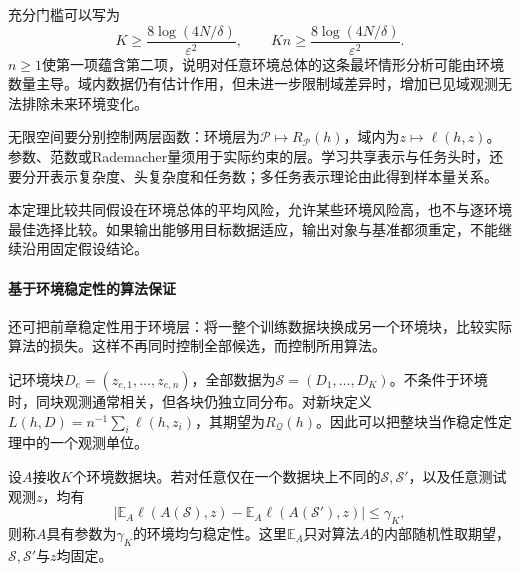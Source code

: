 充分门槛可以写为
\[
 K\geq\frac{8\log(4N/\delta)}{\varepsilon^2},\qquad
 Kn\geq\frac{8\log(4N/\delta)}{\varepsilon^2}.
\]
$n\geq1$使第一项蕴含第二项，说明对任意环境总体的这条最坏情形分析可能由环境数量主导。域内数据仍有估计作用，但未进一步限制域差异时，增加已见域观测无法排除未来环境变化。

无限空间要分别控制两层函数：环境层为$\mathcal P\mapsto R_{\mathcal P}(h)$，域内为$z\mapsto\ell(h,z)$。参数、范数或Rademacher量须用于实际约束的层。学习共享表示与任务头时，还要分开表示复杂度、头复杂度和任务数；多任务表示理论由此得到样本量关系。

本定理比较共同假设在环境总体的平均风险，允许某些环境风险高，也不与逐环境最佳选择比较。如果输出能够用目标数据适应，输出对象与基准都须重定，不能继续沿用固定假设结论。

\paragraph{基于环境稳定性的算法保证}
\label{sec:dg-environment-stability}

还可把前章稳定性用于环境层：将一整个训练数据块换成另一个环境块，比较实际算法的损失。这样不再同时控制全部候选，而控制所用算法。

记环境块$D_e=(z_{e,1},\ldots,z_{e,n})$，全部数据为$\mathcal S=(D_1,\ldots,D_K)$。不条件于环境时，同块观测通常相关，但各块仍独立同分布。对新块定义$L(h,D)=n^{-1}\sum_i\ell(h,z_i)$，其期望为$R_{\mathcal Q}(h)$。因此可以把整块当作稳定性定理中的一个观测单位。

\begin{definition}[环境均匀稳定性]
\label{def:environment-stability}
设$A$接收$K$个环境数据块。若对任意仅在一个数据块上不同的$\mathcal S,\mathcal S'$，以及任意测试观测$z$，均有
\[
 \left|\mathbb E_A\ell(A(\mathcal S),z)
       -\mathbb E_A\ell(A(\mathcal S'),z)\right|\leq\gamma_K,
\]
则称$A$具有参数为$\gamma_K$的环境均匀稳定性。这里$\mathbb E_A$只对算法$A$的内部随机性取期望，$\mathcal S,\mathcal S'$与$z$均固定。
\end{definition}

